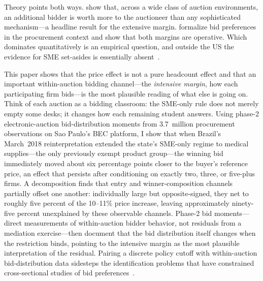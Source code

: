 Theory points both ways. \citet{bulow1996} show that, across a wide class of auction environments, an additional bidder is worth more to the auctioneer than any sophisticated mechanism---a headline result for the extensive margin. \citet{krasnokutskaya2011} formalize bid preferences in the procurement context and show that both margins are operative. Which dominates quantitatively is an empirical question, and outside the US the evidence for SME set-asides is essentially absent~\citep{nakabayashi2013, szucs2024, decarolis2024}.

This paper shows that the price effect is not a pure headcount effect and that an important within-auction bidding channel---the \emph{intensive margin}, how each participating firm bids---is the most plausible reading of what else is going on. Think of each auction as a bidding classroom: the SME-only rule does not merely empty some desks; it changes how each remaining student answers. Using phase-2 electronic-auction bid-distribution moments from 3.7~million procurement observations on Sao Paulo's BEC platform, I show that when Brazil's March~2018 reinterpretation extended the state's SME-only regime to medical supplies---the only previously exempt product group---the winning bid immediately moved about six percentage points closer to the buyer's reference price, an effect that persists after conditioning on exactly two, three, or five-plus firms. A \citet{gelbach2016} decomposition finds that entry and winner-composition channels partially offset one another: individually large but opposite-signed, they net to roughly five percent of the 10--11\% price increase, leaving approximately ninety-five percent unexplained by these observable channels. Phase-2 bid moments---direct measurements of within-auction bidder behavior, not residuals from a mediation exercise---then document that the bid distribution itself changes when the restriction binds, pointing to the intensive margin as the most plausible interpretation of the residual. Pairing a discrete policy cutoff with within-auction bid-distribution data sidesteps the identification problems that have constrained cross-sectional studies of bid preferences~\citep{marion2007, krasnokutskaya2011, athey2013}.

